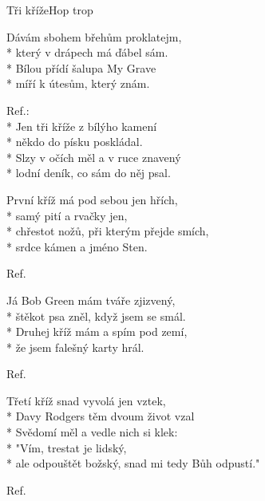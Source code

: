 \documentclass[10.5pt]{book}
\begin{document}
\begin{poem}{Tři kříže}{Hop trop}

\settowidth{\versewidth}{ale odpouštět božský, snad mi tedy Bůh odpustí."}

Dávám sbohem břehům proklatejm,\\*
který v drápech má ďábel sám.\\*
Bílou přídí šalupa My Grave\\*
míří k útesům, který znám.

Ref.:\\*
Jen tři kříže z bílýho kamení\\*
někdo do písku poskládal.\\*
Slzy v očích měl a v ruce znavený\\*
lodní deník, co sám do něj psal.

První kříž má pod sebou jen hřích,\\*
samý pití a rvačky jen,\\*
chřestot nožů, při kterým přejde smích,\\*
srdce kámen a jméno Sten.

Ref.

Já Bob Green mám tváře zjizvený,\\*
štěkot psa zněl, když jsem se smál.\\*
Druhej kříž mám a spím pod zemí,\\*
že jsem falešný karty hrál.

Ref.

Třetí kříž snad vyvolá jen vztek,\\*
Davy Rodgers těm dvoum život vzal\\*
Svědomí měl a vedle nich si klek:\\*
"Vím, trestat je lidský,\\*
ale odpouštět božský, snad mi tedy Bůh odpustí."

Ref.

\end{poem}
\end{document}
